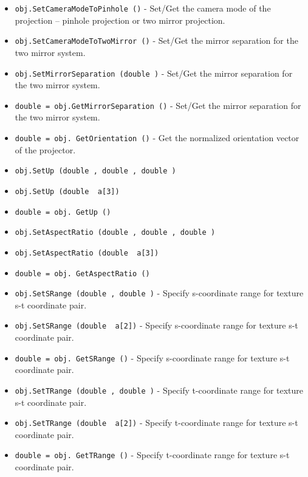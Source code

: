 \begin{itemize}
\item  \verb|obj.SetCameraModeToPinhole ()| -  Set/Get the camera mode of the projection -- pinhole projection or
 two mirror projection.

\item  \verb|obj.SetCameraModeToTwoMirror ()| -  Set/Get the mirror separation for the two mirror system.

\item  \verb|obj.SetMirrorSeparation (double )| -  Set/Get the mirror separation for the two mirror system.

\item  \verb|double = obj.GetMirrorSeparation ()| -  Set/Get the mirror separation for the two mirror system.

\item  \verb|double = obj. GetOrientation ()| -  Get the normalized orientation vector of the projector.

\item  \verb|obj.SetUp (double , double , double )|

\item  \verb|obj.SetUp (double  a[3])|

\item  \verb|double = obj. GetUp ()|

\item  \verb|obj.SetAspectRatio (double , double , double )|

\item  \verb|obj.SetAspectRatio (double  a[3])|

\item  \verb|double = obj. GetAspectRatio ()|

\item  \verb|obj.SetSRange (double , double )| -  Specify s-coordinate range for texture s-t coordinate pair.

\item  \verb|obj.SetSRange (double  a[2])| -  Specify s-coordinate range for texture s-t coordinate pair.

\item  \verb|double = obj. GetSRange ()| -  Specify s-coordinate range for texture s-t coordinate pair.

\item  \verb|obj.SetTRange (double , double )| -  Specify t-coordinate range for texture s-t coordinate pair.

\item  \verb|obj.SetTRange (double  a[2])| -  Specify t-coordinate range for texture s-t coordinate pair.

\item  \verb|double = obj. GetTRange ()| -  Specify t-coordinate range for texture s-t coordinate pair.

\end{itemize}
